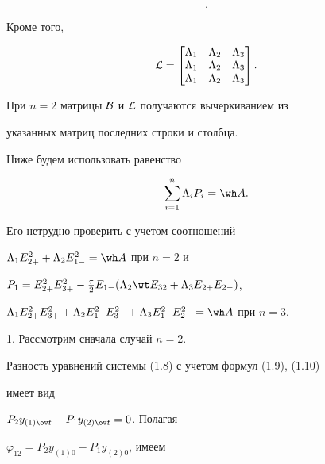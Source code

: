 \begin{pf}
\begin{equation}
.


\end{equation}


Кроме того,


\begin{equation}


{\cal L}=


\begin{bmatrix}


\Lambda_1 & \Lambda_2 & \Lambda_3\\


\Lambda_1 & \Lambda_2 & \Lambda_3\\


\Lambda_1 & \Lambda_2 & \Lambda_3


\end{bmatrix}


.


\end{equation}


При $n=2$ матрицы $\cal B$ и $\cal L$ получаются вычеркиванием из 


указанных матриц последних строки и столбца.





Ниже будем использовать равенство


\begin{equation}


\sum_{i=1}^n\Lambda_iP_i=\wh A .


\end{equation}


Его нетрудно проверить с учетом соотношений


$\Lambda_1E_{2+}^2+\Lambda_2E_{1-}^2=\wh A $ при $n=2$ и


$P_1=E^2_{2+}E^2_{3+}-\frac{\tau}{2}E_{1-}(\Lambda_2\wt E_{32}+


\Lambda_3E_{2+}E_{2-})$, 


$\Lambda_1E_{2+}^2E_{3+}^2+\Lambda_2E_{1-}^2E_{3+}^2+


\Lambda_3E_{1-}^2E_{2-}^2=\wh A $ при $n=3$.





1. Рассмотрим сначала случай $n=2$. 


Разность уравнений системы (1.8) с учетом формул (1.9), (1.10)


имеет вид


$P_2y_{(1)\ov t}-P_1y_{(2)\ov t}=0$. Полагая 


$\varphi_{12}=P_2y_{(1)0}-P_1y_{(2)0}$, имеем 



\end{pf}
